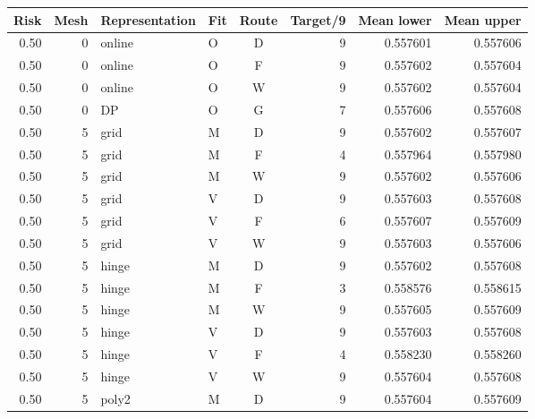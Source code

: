 \begingroup\small\setlength{\tabcolsep}{3pt}

\begin{longtable}{rrllcrrr}\toprule

Risk & Mesh & Representation & Fit & Route & Target/9 & Mean lower & Mean upper\\\midrule\endhead

0.50 & 0 & online & O & D & 9 & 0.557601 & 0.557606 \\

0.50 & 0 & online & O & F & 9 & 0.557602 & 0.557604 \\

0.50 & 0 & online & O & W & 9 & 0.557602 & 0.557604 \\

0.50 & 0 & DP & O & G & 7 & 0.557606 & 0.557608 \\

0.50 & 5 & grid & M & D & 9 & 0.557602 & 0.557607 \\

0.50 & 5 & grid & M & F & 4 & 0.557964 & 0.557980 \\

0.50 & 5 & grid & M & W & 9 & 0.557602 & 0.557606 \\

0.50 & 5 & grid & V & D & 9 & 0.557603 & 0.557608 \\

0.50 & 5 & grid & V & F & 6 & 0.557607 & 0.557609 \\

0.50 & 5 & grid & V & W & 9 & 0.557603 & 0.557606 \\

0.50 & 5 & hinge & M & D & 9 & 0.557602 & 0.557608 \\

0.50 & 5 & hinge & M & F & 3 & 0.558576 & 0.558615 \\

0.50 & 5 & hinge & M & W & 9 & 0.557605 & 0.557609 \\

0.50 & 5 & hinge & V & D & 9 & 0.557603 & 0.557608 \\

0.50 & 5 & hinge & V & F & 4 & 0.558230 & 0.558260 \\

0.50 & 5 & hinge & V & W & 9 & 0.557604 & 0.557608 \\

0.50 & 5 & poly2 & M & D & 9 & 0.557604 & 0.557609 \\


\end{longtable}
